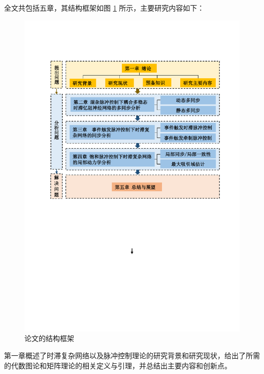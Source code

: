 全文共包括五章，其结构框架如图 \ref{f1-1} 所示，主要研究内容如下：
 \begin{figure}[!hbp]
    \centering
    \includegraphics[scale=0.8]{./ch1Intro/fig1-1.pdf} 
    \caption{论文的结构框架 }
    \label{f1-1}
\end{figure} 
 
第一章概述了时滞复杂网络以及脉冲控制理论的研究背景和研究现状，给出了所需的代数图论和矩阵理论的相关定义与引理，并总结出主要内容和创新点。

